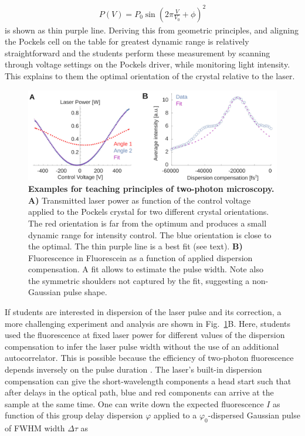\documentclass[10pt,letterpaper]{article}
\begin{document}
\begin{eqnarray}
    P(V) = P_0 \sin\left(2\pi\frac{V}{V_0} + \phi \right)^2
\end{eqnarray}
is shown as thin purple line. Deriving this from geometric principles, and aligning the Pockels cell on the table for greatest dynamic range is relatively straightforward and the students perform these measurement by scanning through voltage settings on the Pockels driver, while monitoring light intensity. This explains to them the optimal orientation of the crystal relative to the laser.\newline
%
\begin{figure}[!t]
    \includegraphics[width=\textwidth]{fig9.jpg}
    \caption{{\bf Examples for teaching principles of two-photon microscopy.} \textbf{A)} Transmitted laser power as function of the control voltage applied to the Pockels crystal for two different crystal orientations. The red orientation is far from the optimum and produces a small dynamic range for intensity control. The blue orientation is close to the optimal. The thin purple line is a best fit (see text). \textbf{B)} Fluorescence in Fluorescein as a function of applied dispersion compensation. A fit allows to estimate the pulse width. Note also the symmetric shoulders not captured by the fit, suggesting a non-Gaussian pulse shape.}
    \label{fig9}
\end{figure}
%
If students are interested in dispersion of the laser pulse and its correction, a more challenging experiment and analysis are shown in Fig.~\ref{fig9}B. Here, students used the fluorescence at fixed laser power for different values of the dispersion compensation to infer the laser pulse width without the use of an additional autocorrelator. This is possible because the efficiency of two-photon fluorescence depends inversely on the pulse duration \cite{Denk1990, Zipfel2003}. The laser's built-in dispersion compensation can give the short-wavelength components a head start such that after delays in the optical path, blue and red components can arrive at the sample at the same time. One can write down the expected fluorescence $I$ as function of this group delay dispersion $\varphi$ applied to a $\varphi_0$-dispersed Gaussian pulse of FWHM width $\Delta\tau$ as
\end{document}
